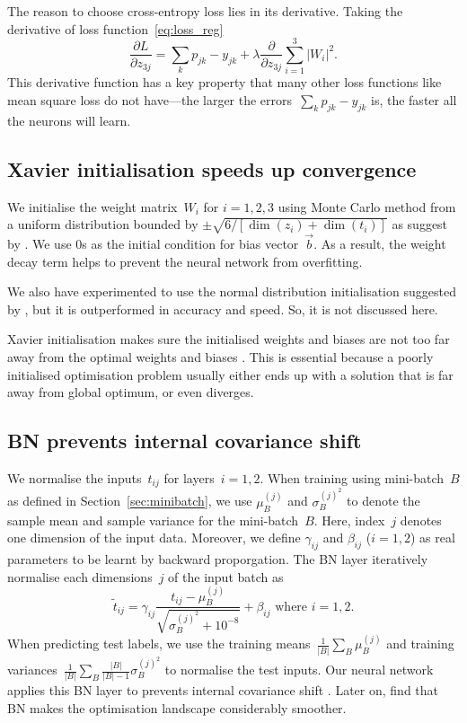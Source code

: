 The reason to choose cross-entropy loss lies in its derivative. Taking the derivative of loss function~\eqref{eq:loss_reg}
\begin{equation*}
  \frac{\partial L}{\partial z_{3j}}=\sum_k p_{jk}-y_{jk}+\lambda\frac{\partial }{\partial z_{3j}}\sum _{i=1}^3\left|W_i\right|^2.  
\end{equation*}
This derivative function has a key property that many other loss functions like mean square loss do not have---the larger the errors~$\sum_k p_{jk}-y_{jk}$ is, the faster all the neurons will learn.

\subsection{Xavier initialisation speeds up convergence\label{sec:xav}}
We initialise the weight matrix~$W_i$ for $i=1,2,3$ using Monte Carlo method from a uniform distribution bounded by $\pm \sqrt{6/\left[\dim(z_i)+\dim(t_i)\right]}$ as suggest by \citet{pmlr-v9-glorot10a}. We use $0$s as the initial condition for bias vector~$\vec b$. As a result, the weight decay term helps to prevent the neural network from overfitting.

We also have experimented to use the normal distribution initialisation suggested by \citet{pmlr-v9-glorot10a}, but it is outperformed in accuracy and speed. So, it is not discussed here.

Xavier initialisation makes sure the initialised weights and biases are not too far away from the optimal weights and biases \citep{pmlr-v9-glorot10a}. This is essential because a poorly initialised optimisation problem usually either ends up with a solution that is far away from global optimum, or even diverges.

\subsection{BN prevents internal covariance shift}
We normalise the inputs~$t_{ij}$ for layers~$i=1,2$. When training using mini-batch~$B$ as defined in Section~\ref{sec:minibatch}, we use $\mu_B^{(j)}$ and $\sigma_B^{(j)^2}$ to denote the sample mean and sample variance for the mini-batch~$B$. Here, index~$j$ denotes one dimension of the input data. Moreover, we define $\gamma_{ij}$ and $\beta_{ij}$ ($i=1,2$) as real parameters to be learnt by backward proporgation. The BN layer iteratively normalise each dimensions~$j$ of the input batch as
\begin{equation}
     {\tilde {t}}_{ij}=\gamma_{ij}\frac {{t}_{ij}-\mu _{B}^{(j)}}{\sqrt {\sigma _{B}^{(j)^{2}}+10^{-8} }}+\beta_{ij} \text{ where } i=1,2.
\end{equation}
When predicting test labels, we use the training means~$\frac{1}{\left|B\right|}\sum_B \mu_B^{(j)}$ and training  variances~$\frac{1}{\left|B\right|}\sum_B \frac{\left|B\right|}{\left|B\right|-1}\sigma_B^{(j)^2}$ to normalise the test inputs.
Our neural network applies this BN layer to prevents internal covariance shift \citep{pmlr-v37-ioffe15}. Later on, \citet{NIPS20187515} find that BN makes the optimisation landscape considerably smoother.

